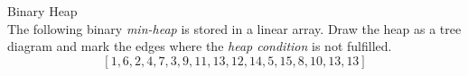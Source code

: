  Binary Heap \\
The following binary \textit{min-heap} is stored in a linear array.
Draw the heap as a tree diagram and mark the edges where the
\textit{heap condition} is not fulfilled.
\begin{displaymath}
  \left[ 1,6,2,4,7,3,9,11,13,12,14,5,15,8,10,13,13 \right]
\end{displaymath}
